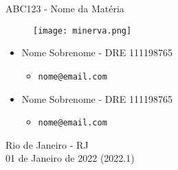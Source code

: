 \begin{titlepage}
    \begin{center}
        \LARGE
        ABC123 - Nome da Matéria
        

        \vspace{1.5cm}

        \Huge
        \thetitle

        \vspace{1.5cm}

        \Huge
        \begin{figure}[h]
            \centering
            \texttt{[image: minerva.png]}
        \end{figure}

        \vspace{2.5cm}

        \large
        \begin{itemize}
            \item Nome Sobrenome - DRE 111198765
                \begin{itemize}
                    \item \texttt{nome@email.com}
                \end{itemize}
            \item Nome Sobrenome - DRE 111198765
                \begin{itemize}
                    \item \texttt{nome@email.com}
                \end{itemize}
        \end{itemize}

        \vspace{1.5cm}


        \vfill
        
        \large
        Rio de Janeiro - RJ\\
        01 de Janeiro de 2022 (2022.1)

    \end{center}
\end{titlepage}